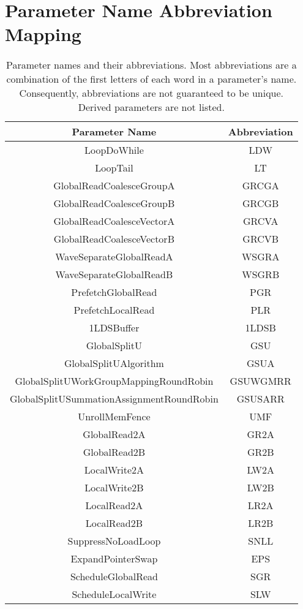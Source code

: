 \documentclass[]{article}
\begin{document}
\section{Parameter Name Abbreviation Mapping}
\begin{center}
\begin{small}
\begin{longtable}{ |c|c| } 
\caption{Parameter names and their abbreviations. Most abbreviations are a combination of the first letters of each word in a parameter's name. Consequently, abbreviations are not guaranteed to be unique. Derived parameters are not listed. }
\label{tab:ParameterAbbrMap}\\
 \hline
 \textbf{Parameter Name} & \textbf{Abbreviation} \\
 \hline
 LoopDoWhile & LDW \\
 LoopTail & LT \\
 GlobalReadCoalesceGroupA & GRCGA \\
 GlobalReadCoalesceGroupB & GRCGB \\
 GlobalReadCoalesceVectorA & GRCVA \\
 GlobalReadCoalesceVectorB & GRCVB \\
 WaveSeparateGlobalReadA & WSGRA \\
 WaveSeparateGlobalReadB & WSGRB \\
 PrefetchGlobalRead & PGR \\
 PrefetchLocalRead & PLR \\
 1LDSBuffer & 1LDSB \\
 GlobalSplitU & GSU \\
 GlobalSplitUAlgorithm & GSUA \\
 GlobalSplitUWorkGroupMappingRoundRobin & GSUWGMRR \\
 GlobalSplitUSummationAssignmentRoundRobin & GSUSARR \\
 UnrollMemFence & UMF \\
 GlobalRead2A & GR2A \\
 GlobalRead2B & GR2B \\
 LocalWrite2A & LW2A \\
 LocalWrite2B & LW2B \\
 LocalRead2A & LR2A \\
 LocalRead2B & LR2B \\
 SuppressNoLoadLoop & SNLL \\
 ExpandPointerSwap & EPS \\
 ScheduleGlobalRead & SGR \\
 ScheduleLocalWrite & SLW \\

\end{longtable}
\end{small}
\end{center}
\end{document}
